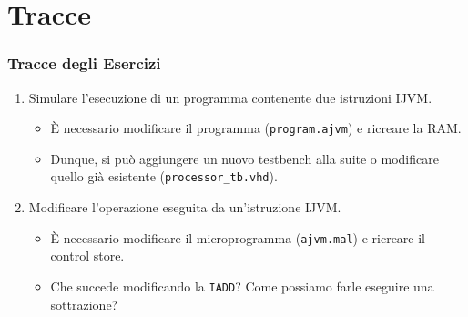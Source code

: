 \documentclass{beamer}
\begin{document}
\section{Tracce}
\begin{frame}
  \frametitle{Tracce degli Esercizi}
  \begin{enumerate}
    \item Simulare l'esecuzione di un programma contenente due istruzioni IJVM.
    \begin{itemize}
      \item È necessario modificare il programma (\lstinline{program.ajvm}) e
      ricreare la RAM.
      \item Dunque, si può aggiungere un nuovo testbench alla suite o
      modificare quello già esistente (\lstinline{processor_tb.vhd}).
    \end{itemize}
    \item Modificare l'operazione eseguita da un'istruzione IJVM.
    \begin{itemize}
      \item È necessario modificare il microprogramma (\lstinline{ajvm.mal}) e
      ricreare il control store.
      \item Che succede modificando la \lstinline{IADD}? Come possiamo farle
      eseguire una sottrazione?
    \end{itemize}
  \end{enumerate}
\end{frame}
\end{document}
